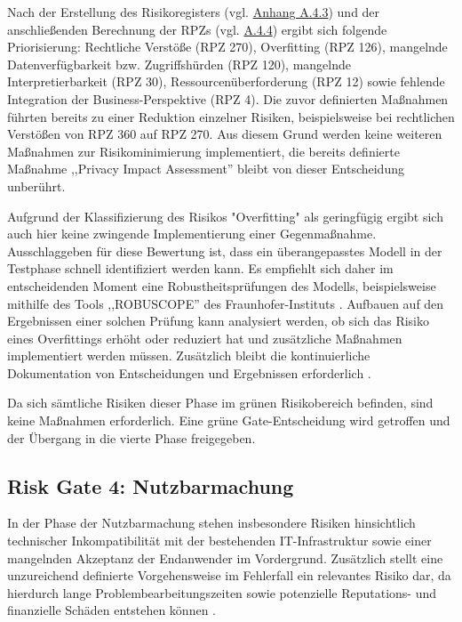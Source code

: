 Nach der Erstellung des Risikoregisters (vgl. \hyperref[tab:cs2_app_rg3_kriterien_rpz]{Anhang A.4.3}) und der anschließenden Berechnung der RPZs (vgl. \hyperref[tab:cs2_app_rg3_rpz_risiken]{A.4.4}) ergibt sich folgende Priorisierung: 
Rechtliche Verstöße (RPZ 270), Overfitting (RPZ 126), mangelnde Datenverfügbarkeit bzw. Zugriffshürden (RPZ 120), mangelnde Interpretierbarkeit (RPZ 30), Ressourcenüberforderung (RPZ 12) sowie fehlende Integration der Business-Perspektive (RPZ 4). 
Die zuvor definierten Maßnahmen führten bereits zu einer Reduktion einzelner Risiken, beispielsweise bei rechtlichen Verstößen von RPZ 360 auf RPZ 270. Aus diesem Grund werden keine weiteren Maßnahmen zur Risikominimierung implementiert, die bereits definierte Maßnahme ,,Privacy Impact Assessment'' bleibt von dieser Entscheidung unberührt.

Aufgrund der Klassifizierung des Risikos "Overfitting" als geringfügig ergibt sich auch hier keine zwingende Implementierung einer Gegenmaßnahme. Ausschlaggeben für diese Bewertung ist, dass ein überangepasstes Modell in der Testphase schnell identifiziert werden kann. Es empfiehlt sich daher im entscheidenden Moment eine Robustheitsprüfungen des Modells, beispielsweise mithilfe des Tools ,,ROBUSCOPE'' des Fraunhofer-Instituts \cite{Frauenhofer_Institut}. Aufbauen auf den Ergebnissen einer solchen Prüfung kann analysiert werden, ob sich das Risiko eines Overfittings erhöht oder reduziert hat und zusätzliche Maßnahmen implementiert werden müssen. 
Zusätzlich bleibt die kontinuierliche Dokumentation von Entscheidungen und Ergebnissen erforderlich \cite{schulz_dasc-pm_2022}.

Da sich sämtliche Risiken dieser Phase im grünen Risikobereich befinden, sind keine Maßnahmen erforderlich. Eine grüne Gate-Entscheidung wird getroffen und der Übergang in die vierte Phase freigegeben.

\subsection{Risk Gate 4: Nutzbarmachung}
In der Phase der Nutzbarmachung stehen insbesondere Risiken hinsichtlich technischer Inkompatibilität mit der bestehenden IT-Infrastruktur sowie einer mangelnden Akzeptanz der Endanwender im Vordergrund. 
Zusätzlich stellt eine unzureichend definierte Vorgehensweise im Fehlerfall ein relevantes Risiko dar, da hierdurch lange Problembearbeitungszeiten sowie potenzielle Reputations- und finanzielle Schäden entstehen können \cite{schulz_dasc-pm_2022}.

